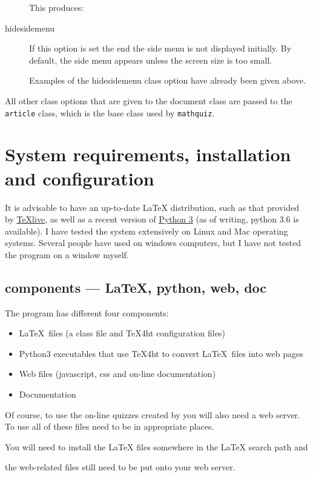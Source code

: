 \documentclass[svgnames]{article}
\newif\ifCtan\Ctanfalse %
\begin{document}
\begin{description}
    

    This produces:


  \item[hidesidemenu]
    If this option is set the end the side menu is not displayed
    initially.  By default, the side menu appears unless the screen size
    is too small.

    Examples of the \textsf{hidesidemenu} class option have already been
    given above.
\end{description}

All other class options that are given to the \MathQuiz document class
are passed to the \texttt{article} class, which is the base class used
by \texttt{mathquiz}.

\section{System requirements, installation and configuration}\label{S:configuration}

    It is advisable to have an up-to-date \LaTeX{} distribution, such
    as that provided by \href{https://www.tug.org/texlive/}{\TeX live},
    as well as a recent version of \href{https://www.python.org/}{Python 3}
    (as of writing, python 3.6 is available). I have tested the
    \MathQuiz system extensively on Linux and Mac operating systems.
    Several people have used \MathQuiz on windows computers, but I
    have not tested the program on a window myself.

    \subsection{\MathQuiz components --- \LaTeX, python, web, doc}

    The \MathQuiz program has different four components:
      \begin{itemize}
           \item \LaTeX\ files (a class file and \TeX4ht configuration files)
           \item Python3 executables that use \TeX4ht to convert \LaTeX\ files into web pages
           \item Web files (javascript, css and on-line documentation)
           \item Documentation
      \end{itemize}
    Of course, to use the on-line quizzes created by \MathQuiz you will
    also need a web server. To use \MathQuiz all of these files need to
    be in appropriate places.
    \ifCtan Fortunately, \ctan[/]{ctan} takes care of most of this but
    \else
    You will need to install the \LaTeX{} files somewhere in the
    \LaTeX{} search path and
    \fi
    the web-related files still need to be put onto your web server.
\end{document}
